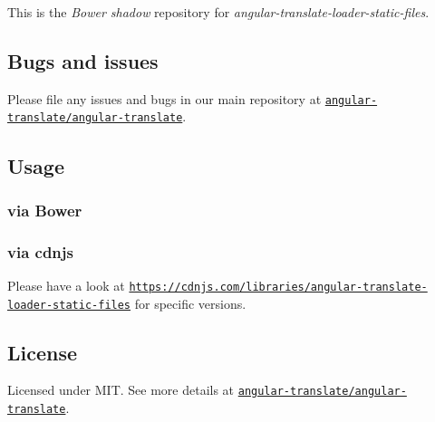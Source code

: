 This is the {\itshape Bower shadow} repository for {\itshape angular-\/translate-\/loader-\/static-\/files}.

\subsection*{Bugs and issues}

Please file any issues and bugs in our main repository at \href{https://github.com/angular-translate/angular-translate/issues}{\tt angular-\/translate/angular-\/translate}.

\subsection*{Usage}

\subsubsection*{via Bower}




\subsubsection*{via cdnjs}

Please have a look at \href{https://cdnjs.com/libraries/angular-translate-loader-static-files}{\tt https\+://cdnjs.\+com/libraries/angular-\/translate-\/loader-\/static-\/files} for specific versions.

\subsection*{License}

Licensed under M\+IT. See more details at \href{https://github.com/angular-translate/angular-translate}{\tt angular-\/translate/angular-\/translate}. 